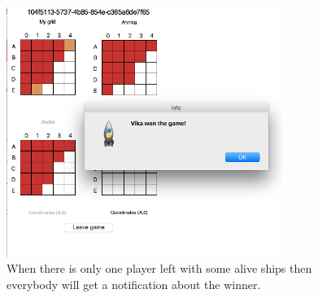 \documentclass[]{article}
\begin{document}
\begin{figure}[!hbt]
	\centering
	\includegraphics[width=0.8\textwidth]{Winner.png}
	\caption{When there is only one player left with some alive ships then everybody will get a notification about the winner.}
	\label{fig:SpectateInit}
\end{figure}
\end{document}
